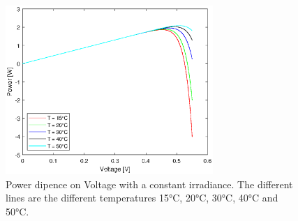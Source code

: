 	\begin{figure}[H]
		\centering
		\includegraphics[width=0.7\textwidth]{figures/xy_vp_t.eps}
		\caption[Power dipence on Voltage with a constant irradiance.]{Power dipence on Voltage with a constant irradiance. The different lines are the different temperatures 15°C, 20°C, 30°C, 40°C and 50°C.}
		\label{fig:xy_vp_t}
	\end{figure}

